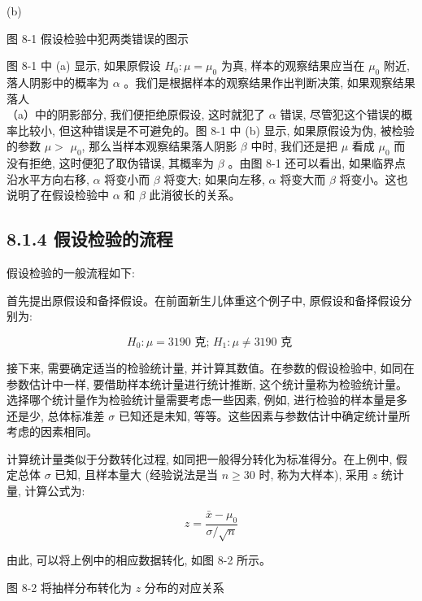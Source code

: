 \documentclass[10pt]{article}
\begin{document}
\begin{CJK*}{UTF8}{bsmi}
\begin{center}
\end{center}

(b)

图 8-1 假设检验中犯两类错误的图示

图 8-1 中 (a) 显示, 如果原假设 $H_{0}: \mu=\mu_{0}$ 为真, 样本的观察结果应当在 $\mu_{0}$ 附近,落人阴影中的概率为 $\alpha$ 。我们是根据样本的观察结果作出判断决策, 如果观察结果落人\\
（a）中的阴影部分, 我们便拒绝原假设, 这时就犯了 $\alpha$ 错误, 尽管犯这个错误的概率比较小, 但这种错误是不可避免的。图 8-1 中 (b) 显示, 如果原假设为伪, 被检验的参数 $\mu>$ $\mu_{0}$, 那么当样本观察结果落人阴影 $\beta$ 中时, 我们还是把 $\mu$ 看成 $\mu_{0}$ 而没有拒绝, 这时便犯了取伪错误, 其概率为 $\beta$ 。由图 8-1 还可以看出, 如果临界点沿水平方向右移, $\alpha$ 将变小而 $\beta$ 将变大; 如果向左移, $\alpha$ 将变大而 $\beta$ 将变小。这也说明了在假设检验中 $\alpha$ 和 $\beta$ 此消彼长的关系。

\subsection*{8.1.4 假设检验的流程}
假设检验的一般流程如下:

首先提出原假设和备择假设。在前面新生儿体重这个例子中, 原假设和备择假设分别为:

$$
H_{0}: \mu=3190 \text { 克; } H_{1}: \mu \neq 3190 \text { 克 }
$$

接下来, 需要确定适当的检验统计量, 并计算其数值。在参数的假设检验中, 如同在参数估计中一样, 要借助样本统计量进行统计推断, 这个统计量称为检验统计量。选择哪个统计量作为检验统计量需要考虑一些因素, 例如, 进行检验的样本量是多还是少, 总体标准差 $\sigma$ 已知还是未知, 等等。这些因素与参数估计中确定统计量所考虑的因素相同。

计算统计量类似于分数转化过程, 如同把一般得分转化为标准得分。在上例中, 假定总体 $\sigma$ 已知, 且样本量大 (经验说法是当 $n \geqslant 30$ 时, 称为大样本), 采用 $z$ 统计量, 计算公式为:


\begin{equation*}
z=\frac{\bar{x}-\mu_{0}}{\sigma / \sqrt{n}} \tag{8.1}
\end{equation*}


由此, 可以将上例中的相应数据转化, 如图 8-2 所示。

\begin{center}
\end{center}

图 8-2 将抽样分布转化为 $z$ 分布的对应关系


\end{CJK*}
\end{document}
